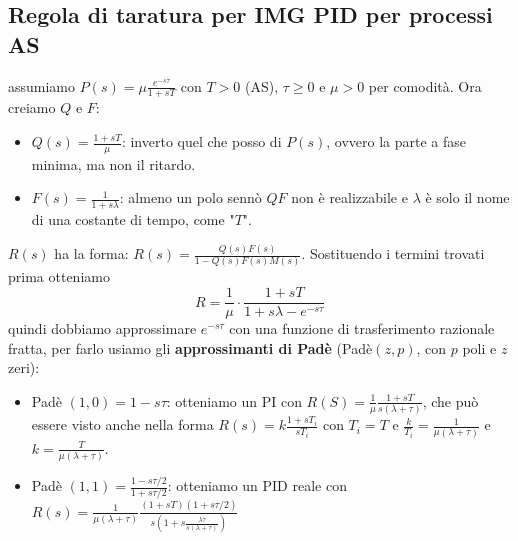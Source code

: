     \subsection{Regola di taratura per IMG PID per processi AS}
    assumiamo $P(s) = \mu \frac{e^{-s \tau}}{1+s T}$ con $T> 0$ (AS), $\tau \geq 0$ e $\mu > 0$ per comodità.\newline
    \newline
    Ora creiamo $Q$ e $F$:
    \begin{itemize}
        \item $Q(s) = \frac{1 + s T}{\mu}$: inverto quel che posso di $P(s)$, ovvero la parte a fase minima, ma non il ritardo.
        \item $F(s) = \frac{1}{1+s \lambda}$: almeno un polo sennò $QF$ non è realizzabile e $\lambda$ è solo il nome di una costante di tempo, come "$T$".
    \end{itemize}
    $R(s)$ ha la forma: $R(s)= \frac{Q(s) F(s)}{1- Q(s)F(s)M(s)}$. Sostituendo i termini trovati prima otteniamo
    \[
        R = \frac{1}{\mu} \cdot \frac{1+sT}{1+s \lambda - e^{-s \tau}}
    \]
    quindi dobbiamo approssimare $e^{-s \tau}$ con una funzione di trasferimento razionale fratta, per farlo usiamo gli \textbf{approssimanti di Padè} (Padè$(z,p)$, con $p$ poli e $z$ zeri):
    \begin{itemize}
        \item Padè $(1,0) = 1- s \tau$: otteniamo un PI con $R(S) = \frac{1}{\mu} \frac{1+sT}{s(\lambda + \tau)}$, che può essere visto anche nella forma $R(s) = k \frac{1+ s T_i}{sT_i}$ con $T_i = T$ e $\frac{k}{T_i} = \frac{1}{\mu(\lambda+\tau)}$ e $k = \frac{T}{\mu(\lambda + \tau)}$.
        \item Padè $(1,1) = \frac{1-s \tau/2}{1 + s \tau/2}$: otteniamo un PID reale con $R(s) = \frac{1}{\mu (\lambda + \tau)} \frac{(1+sT) (1+s \tau/2)}{s (1+ s \frac{\lambda \tau}{s (\lambda + \tau)})}$
    \end{itemize}
